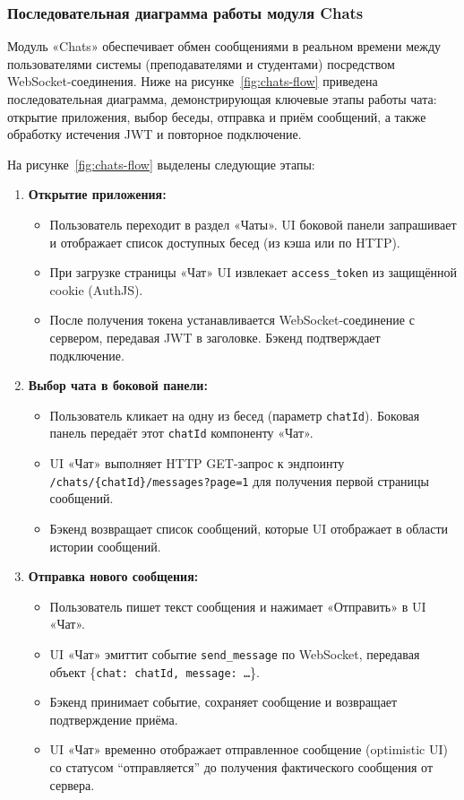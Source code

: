 \subsubsection{Последовательная диаграмма работы модуля Chats}
Модуль «Chats» обеспечивает обмен сообщениями в реальном времени между пользователями системы (преподавателями и студентами) посредством WebSocket-соединения. Ниже на рисунке~\ref{fig:chats-flow} приведена последовательная диаграмма, демонстрирующая ключевые этапы работы чата: открытие приложения, выбор беседы, отправка и приём сообщений, а также обработку истечения JWT и повторное подключение.

На рисунке~\ref{fig:chats-flow} выделены следующие этапы:

\begin{enumerate}
    \item \textbf{Открытие приложения:}
    \begin{itemize}
        \item Пользователь переходит в раздел «Чаты». UI боковой панели запрашивает и отображает список доступных бесед (из кэша или по HTTP).
        \item При загрузке страницы «Чат» UI извлекает \texttt{access\_token} из защищённой cookie (AuthJS).
        \item После получения токена устанавливается WebSocket-соединение с сервером, передавая JWT в заголовке. Бэкенд подтверждает подключение.
    \end{itemize}

    \item \textbf{Выбор чата в боковой панели:}
    \begin{itemize}
        \item Пользователь кликает на одну из бесед (параметр \texttt{chatId}). Боковая панель передаёт этот \texttt{chatId} компоненту «Чат».
        \item UI «Чат» выполняет HTTP GET-запрос к эндпоинту \texttt{/chats/\{chatId\}/messages?page=1} для получения первой страницы сообщений.
        \item Бэкенд возвращает список сообщений, которые UI отображает в области истории сообщений.
    \end{itemize}

    \item \textbf{Отправка нового сообщения:}
    \begin{itemize}
        \item Пользователь пишет текст сообщения и нажимает «Отправить» в UI «Чат».
        \item UI «Чат» эмиттит событие \texttt{send\_message} по WebSocket, передавая объект \{\texttt{chat: chatId, message: {…}}\}.
        \item Бэкенд принимает событие, сохраняет сообщение и возвращает подтверждение приёма.
        \item UI «Чат» временно отображает отправленное сообщение (optimistic UI) со статусом “отправляется” до получения фактического сообщения от сервера.
    \end{itemize}


\end{enumerate}
